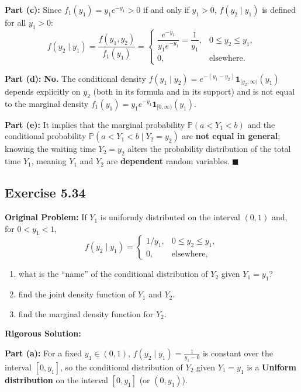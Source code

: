 \documentclass[11pt, letterpaper]{article}
\theoremstyle{definition}
\theoremstyle{remark}
\newcommand{\Prob}{\mathbb{P}}
\begin{document}
\textbf{Part (c):} Since $f_1(y_1) = y_1 e^{-y_1} > 0$ if and only if $y_1 > 0$, $f(y_2 \mid y_1)$ is defined for all $y_1 > 0$:
\[ f(y_2 \mid y_1) = \frac{f(y_1, y_2)}{f_1(y_1)} = \begin{cases} \dfrac{e^{-y_1}}{y_1 e^{-y_1}} = \dfrac{1}{y_1}, & 0 \le y_2 \le y_1, \\ 0, & \text{elsewhere.} \end{cases} \]

\textbf{Part (d):} \textbf{No.} The conditional density $f(y_1 \mid y_2) = e^{-(y_1 - y_2)} \mathbf{1}_{[y_2, \infty)}(y_1)$ depends explicitly on $y_2$ (both in its formula and in its support) and is not equal to the marginal density $f_1(y_1) = y_1 e^{-y_1} \mathbf{1}_{[0, \infty)}(y_1)$.

\textbf{Part (e):} It implies that the marginal probability $\Prob(a < Y_1 < b)$ and the conditional probability $\Prob(a < Y_1 < b \mid Y_2 = y_2)$ are \textbf{not equal in general}; knowing the waiting time $Y_2 = y_2$ alters the probability distribution of the total time $Y_1$, meaning $Y_1$ and $Y_2$ are \textbf{dependent} random variables. $\blacksquare$

\subsection{Exercise 5.34}

\textbf{Original Problem:}
If $Y_1$ is uniformly distributed on the interval $(0, 1)$ and, for $0 < y_1 < 1$,
\[ f(y_2 \mid y_1) = \begin{cases} 1/y_1, & 0 \le y_2 \le y_1, \\ 0, & \text{elsewhere,} \end{cases} \]
\begin{enumerate}[label=\textbf{\alph*}]
    \item what is the ``name'' of the conditional distribution of $Y_2$ given $Y_1 = y_1$?
    \item find the joint density function of $Y_1$ and $Y_2$.
    \item find the marginal density function for $Y_2$.
\end{enumerate}

\textbf{Rigorous Solution:}

\textbf{Part (a):} For a fixed $y_1 \in (0, 1)$, $f(y_2 \mid y_1) = \frac{1}{y_1 - 0}$ is constant over the interval $[0, y_1]$, so the conditional distribution of $Y_2$ given $Y_1 = y_1$ is a \textbf{Uniform distribution} on the interval $[0, y_1]$ (or $(0, y_1)$).
\end{document}
